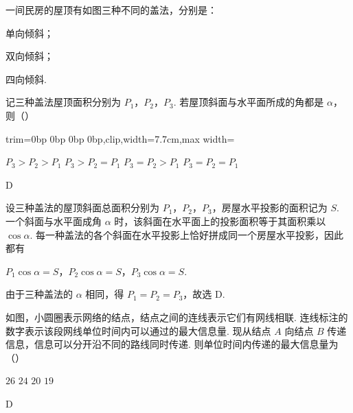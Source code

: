\begin{problem}
一间民房的屋顶有如图三种不同的盖法，分别是：

\begin{circlelist}
\item 单向倾斜；
\item 双向倾斜；
\item 四向倾斜.
\end{circlelist}

记三种盖法屋顶面积分别为 \(P_{1}\)，\(P_{2}\)，\(P_{3}\). 若屋顶斜面与水平面所成的角都是 \(\alpha\)，则（\quad）

\problemresetlayout
\begingroup
\expandafter\def\csname bitmaplayout@img/2001/henan_guangdong/q11_fig1.png\endcsname{trim={0bp 0bp 0bp 0bp},clip,width=7.7cm,max width=\linewidth}
\endgroup

\choices
    {\(P_{3} > P_{2} > P_{1}\)}
    {\(P_{3} > P_{2} = P_{1}\)}
    {\(P_{3} = P_{2} > P_{1}\)}
    {\(P_{3} = P_{2} = P_{1}\)}
\end{problem}

\begin{answer}
D
\end{answer}

\begin{solution}
设三种盖法的屋顶斜面总面积分别为 \(P_1\)，\(P_2\)，\(P_3\)，房屋水平投影的面积记为 \(S\). 一个斜面与水平面成角 \(\alpha\) 时，该斜面在水平面上的投影面积等于其面积乘以 \(\cos\alpha\). 每一种盖法的各个斜面在水平投影上恰好拼成同一个房屋水平投影，因此都有

\(P_1\cos\alpha=S\)，\(P_2\cos\alpha=S\)，\(P_3\cos\alpha=S\).

由于三种盖法的 \(\alpha\) 相同，得 \(P_1=P_2=P_3\)，故选 D.
\end{solution}

\begin{problem}
如图，小圆圈表示网络的结点，结点之间的连线表示它们有网线相联. 连线标注的数字表示该段网线单位时间内可以通过的最大信息量. 现从结点 \(A\) 向结点 \(B\) 传递信息，信息可以分开沿不同的路线同时传递. 则单位时间内传递的最大信息量为（\quad）


\choices
    {\(26\)}
    {\(24\)}
    {\(20\)}
    {\(19\)}
\end{problem}

\begin{answer}
D
\end{answer}


